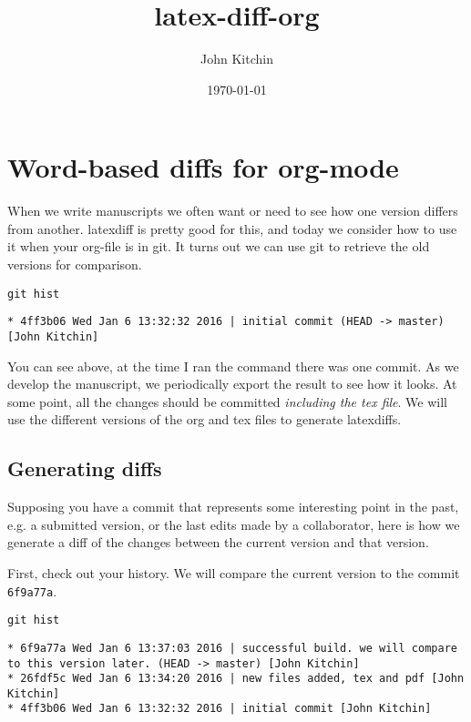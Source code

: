 \documentclass[11pt]{article}
\author{John Kitchin}
\date{\today}
\title{latex-diff-org}
\begin{document}
\tableofcontents

\section{Word-based diffs for org-mode}
\label{sec-1}

When we write manuscripts we often want or need to see how one version differs from another. latexdiff is pretty good for this, and today we consider how to use it when your org-file is in git. It turns out we can use git to retrieve the old versions for comparison.

\begin{verbatim}
git hist
\end{verbatim}

\begin{verbatim}
* 4ff3b06 Wed Jan 6 13:32:32 2016 | initial commit (HEAD -> master) [John Kitchin]
\end{verbatim}

You can see above, at the time I ran the command there was one commit. As we develop the manuscript, we periodically export the result to see how it looks. At some point, all the changes should be committed \emph{including the tex file}. We will use the different versions of the org and tex files to generate latexdiffs.

\subsection{Generating diffs}
\label{sec-1-1}
Supposing you have a commit that represents some interesting point in the past, e.g. a submitted version, or the last edits made by a collaborator, here is how we generate a diff of the changes between the current version and that version.

First, check out your history. We will compare the current version to the commit \texttt{6f9a77a}.

\begin{verbatim}
git hist
\end{verbatim}

\begin{verbatim}
* 6f9a77a Wed Jan 6 13:37:03 2016 | successful build. we will compare to this version later. (HEAD -> master) [John Kitchin]
* 26fdf5c Wed Jan 6 13:34:20 2016 | new files added, tex and pdf [John Kitchin]
* 4ff3b06 Wed Jan 6 13:32:32 2016 | initial commit [John Kitchin]
\end{verbatim}
\end{document}
